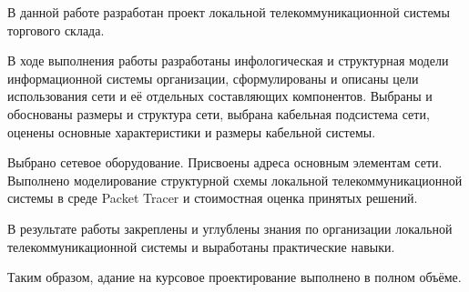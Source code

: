
В данной работе разработан проект локальной телекоммуникационной системы торгового склада. 

В ходе выполнения работы разработаны инфологическая и структурная модели информационной системы организации, сформулированы и описаны цели использования сети и её отдельных составляющих компонентов. Выбраны и обоснованы размеры и структура сети, выбрана кабельная подсистема сети, оценены основные характеристики и размеры кабельной системы. 

Выбрано сетевое оборудование. Присвоены адреса основным элементам сети. Выполнено моделирование структурной схемы локальной телекоммуникационной системы в среде Packet Tracer и стоимостная оценка принятых решений.

В результате работы закреплены и углублены знания по организации локальной телекоммуникационной системы и выработаны практические навыки. 

Таким образом, адание на курсовое проектирование выполнено в полном объёме.  